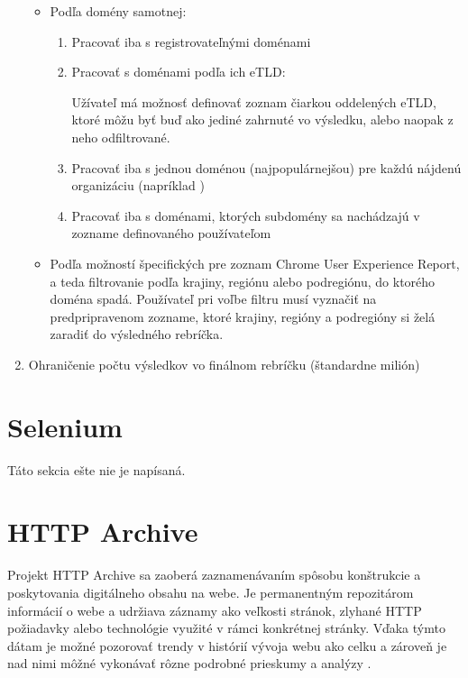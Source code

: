 \begin{enumerate}
\begin{itemize}
        \item Podľa domény samotnej:
        \begin{enumerate}
            \item Pracovať iba s registrovateľnými doménami
            \item Pracovať s doménami podľa ich eTLD:
            
            Užívateľ má možnosť definovať zoznam čiarkou oddelených eTLD, ktoré môžu byť buď ako jediné zahrnuté vo
            výsledku, alebo naopak z neho odfiltrované.
            
            \item Pracovať iba s jednou doménou (najpopulárnejšou) pre každú nájdenú organizáciu (napríklad )
            \item Pracovať iba s doménami, ktorých subdomény sa nachádzajú v zozname definovaného používateľom
        \end{enumerate}

        \item Podľa možností špecifických pre zoznam Chrome User Experience Report, a teda filtrovanie podľa krajiny, regiónu alebo podregiónu, do ktorého doména spadá. Používateľ pri voľbe filtru musí vyznačiť na predpripravenom zozname, ktoré krajiny, regióny a podregióny si želá zaradiť do výsledného rebríčka.
    \end{itemize}

    \item Ohraničenie počtu výsledkov vo finálnom rebríčku (štandardne milión)
    
\end{enumerate}


\section{Selenium}
\label{selenium}

Táto sekcia ešte nie je napísaná.

\section{HTTP Archive}
\label{httparchive}

Projekt HTTP Archive sa zaoberá zaznamenávaním spôsobu konštrukcie a poskytovania digitálneho obsahu na webe. Je permanentným repozitárom informácií o webe a udržiava záznamy ako veľkosti
stránok, zlyhané HTTP požiadavky alebo technológie využité v rámci konkrétnej stránky. Vďaka týmto dátam je možné pozorovať trendy v histórií vývoja webu ako celku a zároveň je nad nimi môžné vykonávať
rôzne podrobné prieskumy a analýzy \cite{httparchive-about}. 

